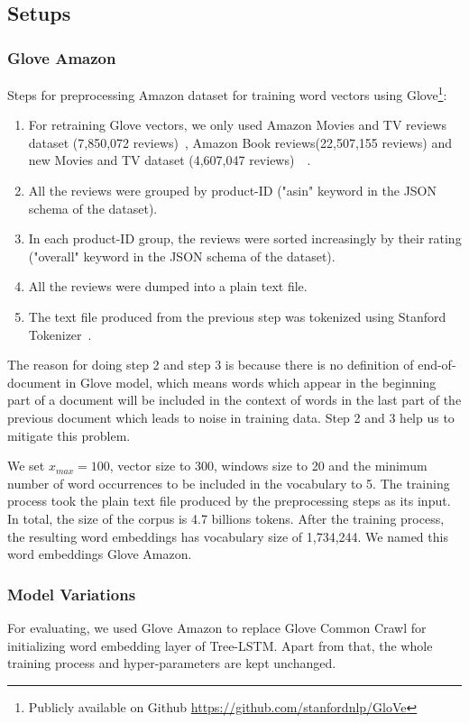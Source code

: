 \subsection{Setups}
\subsubsection{Glove Amazon}
Steps for preprocessing Amazon dataset for training word vectors using Glove\footnote{Publicly available on Github \url{https://github.com/stanfordnlp/GloVe}}:
\begin{enumerate}
	\item For retraining Glove vectors, we only used Amazon Movies and TV reviews dataset (7,850,072 reviews)~\cite{mcauley2013hidden}, Amazon Book reviews(22,507,155 reviews) and new Movies and TV dataset (4,607,047 reviews)~\cite{McAuleyTSH15}~\cite{HeM16}.
	\item All the reviews were grouped by product-ID ("asin" keyword in the JSON schema of the dataset).
	\item In each product-ID group, the reviews were sorted increasingly by their rating ("overall" keyword in the JSON schema of the dataset).
	\item All the reviews were dumped into a plain text file.
	\item The text file produced from the previous step was tokenized using Stanford Tokenizer~\cite{tokenizerpart}.
\end{enumerate}

The reason for doing step 2 and step 3 is because there is no definition of end-of-document in Glove model, which means words which appear in the beginning part of a document will be included in the context of words in the last part of the previous document which leads to noise in training data. Step 2 and 3 help us to mitigate this problem.

We set $x_{max} = 100$, vector size to 300, windows size to 20 and the minimum number of word occurrences to be included in the vocabulary to 5.
The training process took the plain text file produced by the preprocessing steps as its input.
In total, the size of the corpus is 4.7 billions tokens.
After the training process, the resulting word embeddings has vocabulary size of 1,734,244.
We named this word embeddings Glove Amazon.
\subsubsection{Model Variations}
For evaluating, we used Glove Amazon to replace Glove Common Crawl for initializing word embedding layer of Tree-LSTM.
Apart from that, the whole training process and hyper-parameters are kept unchanged.

